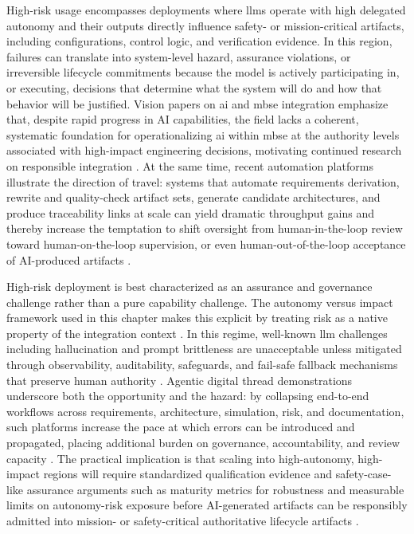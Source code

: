 High-risk usage encompasses deployments where \acp{llm} operate with high delegated autonomy and their outputs directly influence safety- or mission-critical artifacts, including configurations, control logic, and verification evidence. In this region, failures can translate into system-level hazard, assurance violations, or irreversible lifecycle commitments because the model is actively participating in, or executing, decisions that determine what the system will do and how that behavior will be justified. Vision papers on \ac{ai} and \ac{mbse} integration emphasize that, despite rapid progress in AI capabilities, the field lacks a coherent, systematic foundation for operationalizing \ac{ai} within \ac{mbse} at the authority levels associated with high-impact engineering decisions, motivating continued research on responsible integration \cite{chami_ArtificialIntelligenceCapabilities_2022}. 
At the same time, recent automation platforms illustrate the direction of travel: systems that automate requirements derivation, rewrite and quality-check artifact sets, generate candidate architectures, and produce traceability links at scale can yield dramatic throughput gains and thereby increase the temptation to shift oversight from human-in-the-loop review toward human-on-the-loop supervision, or even human-out-of-the-loop acceptance of AI-produced artifacts \cite{cannizzaro_SystemsEngineeringAutomation_2025}.

High-risk deployment is best characterized as an assurance and governance challenge rather than a pure capability challenge. The autonomy versus impact framework used in this chapter makes this explicit by treating risk as a native property of the integration context \cite{otten_GenerativeAISystemsRiskAssessment_2026}. In this regime, well-known \ac{llm} challenges including hallucination and prompt brittleness are unacceptable unless mitigated through observability, auditability, safeguards, and fail-safe fallback mechanisms that preserve human authority \cite{kalai_WhyLanguageModelsHallucinate_2025,otten_GenerativeAISystemsRiskAssessment_2026, sclar_QuantifyingLanguageModelsSensitivity_2024}. Agentic digital thread demonstrations underscore both the opportunity and the hazard: by collapsing end-to-end workflows across requirements, architecture, simulation, risk, and documentation, such platforms increase the pace at which errors can be introduced and propagated, placing additional burden on governance, accountability, and review capacity \cite{Helmerich_Transforming_Systems_Engineering_Agentic_AI_2025}. The practical implication is that scaling into high-autonomy, high-impact regions will require standardized qualification evidence and safety-case-like assurance arguments such as maturity metrics for robustness and measurable limits on autonomy-risk exposure before AI-generated artifacts can be responsibly admitted into mission- or safety-critical authoritative lifecycle artifacts \cite{otten_GenerativeAISystemsRiskAssessment_2026, NIST_ArtificialIntelligenceRisk_2023, Johnson_Operationalizing_AI_Assurance_2025, Pomales_Measuring_Influencing_Trustworthiness_AI_Enabled_Systems_2025}.

